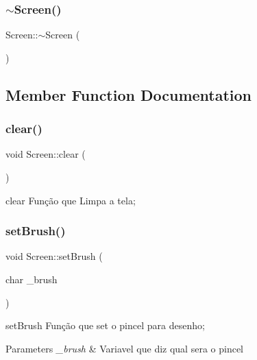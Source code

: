 \subsubsection{\texorpdfstring{$\sim$\+Screen()}{~Screen()}}
{\footnotesize\ttfamily Screen\+::$\sim$\+Screen (\begin{DoxyParamCaption}{ }\end{DoxyParamCaption})}



\subsection{Member Function Documentation}
\mbox{\label{class_screen_a35e74266b2a04e37b354ceff7a5f1031}} 
\subsubsection{\texorpdfstring{clear()}{clear()}}
{\footnotesize\ttfamily void Screen\+::clear (\begin{DoxyParamCaption}{ }\end{DoxyParamCaption})}



clear Função que Limpa a tela; 

\mbox{\label{class_screen_aebc4eb6cb5acf15a0f04c1494622ab23}} 
\subsubsection{\texorpdfstring{set\+Brush()}{setBrush()}}
{\footnotesize\ttfamily void Screen\+::set\+Brush (\begin{DoxyParamCaption}\item[{char}]{\+\_\+brush }\end{DoxyParamCaption})}



set\+Brush Função que set o pincel para desenho; 


\begin{DoxyParams}{Parameters}
{\em \+\_\+brush} & Variavel que diz qual sera o pincel \\
\hline
\end{DoxyParams}
\mbox{\label{class_screen_ae6bea81c57a22d226507c3c26fa95ee0}} 
